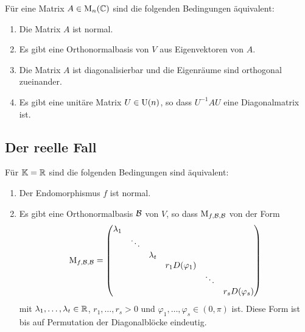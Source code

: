 \begin{corollary}
  Für eine Matrix $A \in \operatorname{M}_{n}(\mathbb{C})$ sind die folgenden Bedingungen äquivalent:
  \begin{enumerate}
    \item
      Die Matrix $A$ ist normal.
    \item
      Es gibt eine Orthonormalbasis von $V$ aus Eigenvektoren von $A$.
    \item
      Die Matrix $A$ ist diagonalisierbar und die Eigenräume sind orthogonal zueinander.
    \item
      Es gibt eine unitäre Matrix $U \in \operatorname{U}(n)$, so dass $U^{-1} A U$ eine Diagonalmatrix ist.
  \end{enumerate}
\end{corollary}



\subsection{Der reelle Fall}

\begin{theorem}
  Für $\mathbb{K} = \mathbb{R}$ sind die folgenden Bedingungen sind äquivalent:
  \begin{enumerate}
    \item
      Der Endomorphismus $f$ ist normal.
    \item
      Es gibt eine Orthonormalbasis $\mathcal{B}$ von $V$, so dass $\operatorname{M}_{f, \mathcal{B}, \mathcal{B}}$ von der Form
      \begin{equation}
      \label{equation: normal form for real normal endomorphisms}
          \operatorname{M}_{f, \mathcal{B}, \mathcal{B}}
        = \begin{pmatrix}
            \lambda_1 &         &           &                   &         &                   \\
                      & \ddots  &           &                   &         &                   \\
                      &         & \lambda_t &                   &         &                   \\
                      &         &           & r_1 D(\varphi_1)  &         &                   \\
                      &         &           &                   & \ddots  &                   \\
                      &         &           &                   &         & r_s D(\varphi_s)
          \end{pmatrix}
      \end{equation}
      mit $\lambda_1, \dotsc, \lambda_t \in \mathbb{R}$, $r_1, \dotsc, r_s > 0$ und $\varphi_1, \dotsc, \varphi_s \in (0, \pi)$ ist.
      Diese Form ist bis auf Permutation der Diagonalblöcke eindeutig.
  \end{enumerate}
\end{theorem}

